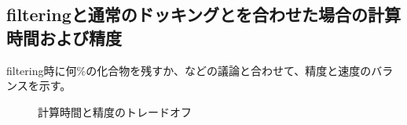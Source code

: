 \subsection{filteringと通常のドッキングとを合わせた場合の計算時間および精度}
filtering時に何\%の化合物を残すか、などの議論と合わせて、精度と速度のバランスを示す。
\begin{figure}[htp]
 \begin{center}
  \caption{計算時間と精度のトレードオフ}
  \label{fig:trade_off}
 \end{center}
\end{figure}
